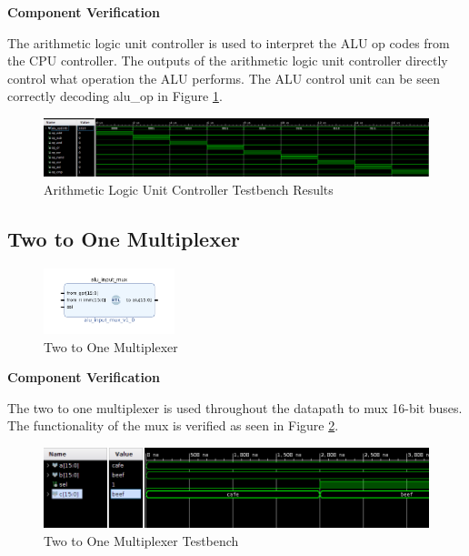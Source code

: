 \documentclass{article}
\newcommand{\stitle}{Component Verification}
\begin{document}
\begin{par}
	\textbf{\stitle}
	\begin{par}
		The arithmetic logic unit controller is used to interpret the ALU op codes from the CPU controller. The outputs of the arithmetic logic unit controller directly control what operation the ALU performs. The ALU control unit can be seen correctly decoding alu\_op in Figure \ref{fig:aluCtrlfig}.
	\end{par}


	\begin{figure}[H]
		\centering
		\includegraphics[width=7in]{img/alu_ctrl_tb.png}
		\caption{Arithmetic Logic Unit Controller Testbench Results}
		\label{fig:aluCtrlfig}
	\end{figure}

	\newpage
	
	\subsection{Two to One Multiplexer}
	
	\begin{figure}[H]
		\centering
		\includegraphics[width=1.5in]{img/aluMux.png}
		\caption{Two to One Multiplexer}
	\end{figure}
	
	\textbf{\stitle}
	\begin{par}
		The two to one multiplexer is used throughout the datapath to mux 16-bit buses. The functionality of the mux is verified as seen in Figure \ref{fig:muxtb}.
	\end{par}


	\begin{figure}[H]
		\centering
		\includegraphics[width=7in]{img/2to1muxtb.png}
		\caption{Two to One Multiplexer Testbench}
		\label{fig:muxtb}
	\end{figure}
	

\end{par}
\end{document}
